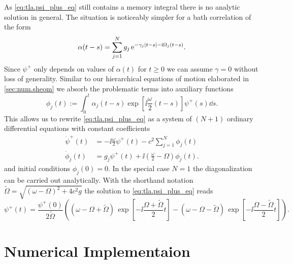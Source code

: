 As \autoref{eq:tla.psi_plus_eq} still contains a memory integral there is no analytic solution in general.
The situation is noticeably simpler for a bath correlation of the form
\begin{equation}
  \alpha(t - s) = \sum_{j=1}^N g_j \, \exp[-\gamma_j \abs{t - s} - \ii \Omega_j (t - s)].
  \label{eq:tla.exp_alpha}
\end{equation}
Since $\psi^+$ only depends on values of $\alpha(t)$ for $t \ge 0$ we can assume $\gamma = 0$ without loss of generality.
Similar to our hierarchical equations of motion elaborated in \autoref{sec:num.sheom} we absorb the problematic terms into auxiliary functions
\begin{equation}
  \phi_j(t) := \int_0^t \alpha_j(t-s) \exp[\ii \frac{\omega}{2}(t-s)] \psi^+(s) \dd s.
  \label{eq:tla.auxiliary}
\end{equation}
This allows us to rewrite \autoref{eq:tla.psi_plus_eq} as a system of $(N+1)$ ordinary differential equations with constant coefficients
\begin{align*}
  \dot\psi^+(t) &= -\ii \frac{\omega}{2} \psi^+(t) - c^2 \sum_{j=1}^N \phi_j(t) \\
  \dot\phi_j(t) &= g_j \psi^+(t) + \ii \left( \frac{\omega}{2} - \Omega \right) \phi_j(t).
\end{align*}
and initial conditions $\phi_j(0) = 0$.
In the special case $N = 1$ the diagonalization can be carried out analytically.
With the shorthand notation $\tilde\Omega = \sqrt{(\omega - \Omega)^2 + 4c^2 g}$ the solution to \autoref{eq:tla.psi_plus_eq} reads
\begin{equation}
  \psi^+(t) = \frac{\psi^+(0)}{2\tilde\Omega} \left( (\omega - \Omega + \tilde\Omega) \, \exp[-\ii \frac{\Omega + \tilde\Omega}{2} t ]  -  (\omega - \Omega - \tilde\Omega) \, \exp[-\ii \frac{\Omega - \tilde\Omega}{2} t ] \right).
  \label{eq:tla.solution}
\end{equation}

%

\chapter{Numerical Implementaion}
\label{cha:implement}
